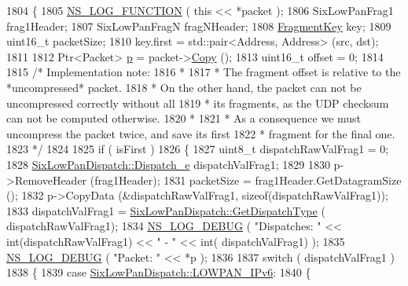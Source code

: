 \begin{DoxyCode}
1804 \{
1805   \hyperlink{log-macros-disabled_8h_a90b90d5bad1f39cb1b64923ea94c0761}{NS\_LOG\_FUNCTION} ( \textcolor{keyword}{this} << *packet );
1806   SixLowPanFrag1 frag1Header;
1807   SixLowPanFragN fragNHeader;
1808   \hyperlink{classns3_1_1SixLowPanNetDevice_a8e3be88fc6596428b23fb7b220f8e148}{FragmentKey} key;
1809   uint16\_t packetSize;
1810   key.first = std::pair<Address, Address> (src, dst);
1811 
1812   Ptr<Packet> \hyperlink{lte__link__budget_8m_ac9de518908a968428863f829398a4e62}{p} = packet->\hyperlink{classns3_1_1Packet_a5d5c70802a5f77fc5f0001e0cfc1898b}{Copy} ();
1813   uint16\_t offset = 0;
1814 
1815   \textcolor{comment}{/* Implementation note:}
1816 \textcolor{comment}{   *}
1817 \textcolor{comment}{   * The fragment offset is relative to the *uncompressed* packet.}
1818 \textcolor{comment}{   * On the other hand, the packet can not be uncompressed correctly without all}
1819 \textcolor{comment}{   * its fragments, as the UDP checksum can not be computed otherwise.}
1820 \textcolor{comment}{   *}
1821 \textcolor{comment}{   * As a consequence we must uncompress the packet twice, and save its first}
1822 \textcolor{comment}{   * fragment for the final one.}
1823 \textcolor{comment}{   */}
1824 
1825   \textcolor{keywordflow}{if} ( isFirst )
1826     \{
1827       uint8\_t dispatchRawValFrag1 = 0;
1828       \hyperlink{classns3_1_1SixLowPanDispatch_aa51561db1ae4239db574d31d7aebbb5f}{SixLowPanDispatch::Dispatch\_e} dispatchValFrag1;
1829 
1830       p->RemoveHeader (frag1Header);
1831       packetSize = frag1Header.GetDatagramSize ();
1832       p->CopyData (&dispatchRawValFrag1, \textcolor{keyword}{sizeof}(dispatchRawValFrag1));
1833       dispatchValFrag1 = \hyperlink{classns3_1_1SixLowPanDispatch_a8405023ddddc8aee8825d743cae6ec21}{SixLowPanDispatch::GetDispatchType} (
      dispatchRawValFrag1);
1834       \hyperlink{group__logging_ga413f1886406d49f59a6a0a89b77b4d0a}{NS\_LOG\_DEBUG} ( \textcolor{stringliteral}{"Dispatches: "} << \textcolor{keywordtype}{int}(dispatchRawValFrag1) << \textcolor{stringliteral}{" - "} << \textcolor{keywordtype}{int}(
      dispatchValFrag1) );
1835       \hyperlink{group__logging_ga413f1886406d49f59a6a0a89b77b4d0a}{NS\_LOG\_DEBUG} ( \textcolor{stringliteral}{"Packet: "} << *p );
1836 
1837       \textcolor{keywordflow}{switch} ( dispatchValFrag1 )
1838         \{
1839         \textcolor{keywordflow}{case} \hyperlink{classns3_1_1SixLowPanDispatch_aa51561db1ae4239db574d31d7aebbb5fa04671d540d7ccb77ec76c605193170c2}{SixLowPanDispatch::LOWPAN\_IPv6}:
1840           \{

\end{DoxyCode}
